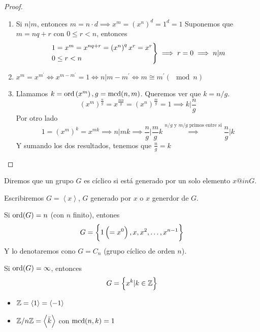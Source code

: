 \begin{proof}
    \begin{enumerate}
        \item Si $n \vert m$, entonces $m = n \cdot d \implies x^m = \left( x^n \right)^d = 1^d = 1$
            Suponemos que $m = nq + r$ con $0 \leq r < n$, entonces
            \[
                \begin{rcases}
                    1 = x^m = x^{nq + r} = \left( x^n \right)^q x^r = x^r \\
                    0 \leq r < n
                \end{rcases}
                \implies r = 0 \implies n \vert m
            \]
        \item $x^m = x^{m^\prime} \iff x^{m - m^\prime} = 1 \iff n \vert m - m^\prime \iff
            m \cong m^\prime (\mod n)$
        \item Llamamos $k = \operatorname{ord}\left( x^m \right), g = \operatorname{mcd}(n, m)$. Queremos ver que $k = n/g$.
            \[
                \left( x^m \right)^{\frac{n}{g}} = x^{\frac{mn}{g}} = \left( x^n \right)^{\frac{m}{g}} = 1
                \implies k \vert \frac{n}{g}
            \]
            Por otro lado
            \[
                1 = \left( x^m \right)^k = x^{mk} \implies n \vert mk \implies \frac{n}{g} \vert \frac{m}{g} k
                \stackrel{n/g \text{ y } m/g \text{ primos entre si}}{\implies} \frac{n}{g} \vert k
            \]
            Y sumando los dos resultados, tenemos que $\frac{n}{g} = k$
    \end{enumerate}
\end{proof}

\begin{defi}
    Diremos que un grupo $G$ es cíclico si está generado por un solo elemento $x @in G$.

    Escribiremos $G = \left< x \right>$, $G$ generado por $x$ o $x$ generdor de $G$.
\end{defi}

\begin{obs}
    Si $\operatorname{ord}(G) = n$ (con $n$ finito), entones
    \[
        G = \left\{ 1 \left( = x^0 \right), x, x^2, \dots, x^{n-1}\right\}
    \]
    Y lo denotaremos cono $G = C_n$ (grupo cíclico de orden $n$).
    
    Si $\operatorname{ord}(G) = \infty$, entonces
    \[
        G = \left\{x^k \vert k \in \mathbb{Z}\right\}
    \]
\end{obs}

\begin{example}
    \begin{itemize}
        \item $\mathbb{Z} = \left< 1 \right> = \left< -1 \right>$
        \item $\mathbb{Z}/n\mathbb{Z} = \left< \bar{k} \right>$ con $\operatorname{mcd}(n, k) = 1$
    \end{itemize}
\end{example}


